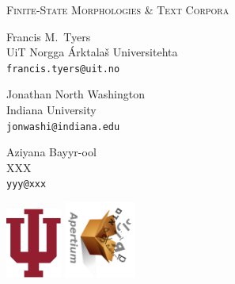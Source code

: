 \documentclass[fontscale=0.33,landscape,paperwidth=841mm,paperheight=1189mm]{baposter}  %
\begin{document}
\begin{poster}
{	}{ %
		{%
			{\titlefont \scshape{Finite-State Morphologies \& Text Corpora\\\vspace{0.2em}}}}
	}{ %
		\vspace{-0.6em}
		\begin{center}
			\begin{minipage}[t]{9em}
				\begin{spacing}{0.4}
				{Francis M.\ Tyers}\\
				{\footnotesize UiT Norgga Árktalaš Universitehta \\\texttt{francis.tyers@uit.no}}
				\end{spacing}
			\end{minipage}
			\begin{minipage}[t]{9.5em}
				\begin{spacing}{0.4}
					{Jonathan North Washington}\\
					{\footnotesize Indiana University\\\texttt{jonwashi@indiana.edu}}
				\end{spacing}
			\end{minipage}
			\begin{minipage}[t]{12em}
				\begin{spacing}{0.4}
					{Aziyana Bayyr-ool}\\
					{\footnotesize XXX\\\texttt{yyy@xxx}}
				\end{spacing}
			\end{minipage}
		\end{center}
	}{ %
		\includegraphics[height=6.25em]{iu_tab-crop}
		\hspace{2.5cm}\includegraphics[angle=90,height=6.8em]{apertium5b}%
	}


\end{poster}
\end{document}
